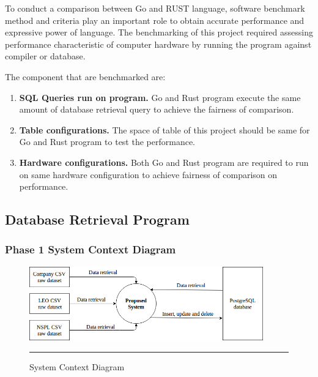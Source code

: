 To conduct a comparison between Go and RUST language, software benchmark method and criteria play an important role to obtain accurate performance and expressive power of language. The benchmarking of this project required assessing performance characteristic of computer hardware by running the program against compiler or database.

The component that are benchmarked are:  

\begin{enumerate}[topsep=0pt,itemsep=-1ex,partopsep=1ex,parsep=1.5ex]
	
	\item \textbf{SQL Queries run on program. } Go and Rust program execute the same amount of database retrieval query to achieve the fairness of comparison.
	\newline
	\item \textbf{Table configurations.} The space of table of this project should be same for Go and Rust program to test the performance. 
	\newline
	\item \textbf{Hardware configurations. } Both Go and Rust program are required to run on same hardware configuration to achieve fairness of comparison on performance.
	\newline
	
\end{enumerate}

\pagebreak

\subsection{Database Retrieval Program}

\subsubsection{Phase 1 System Context Diagram}

\begin{figure}[H]
	\centering
	\includegraphics[width=0.9\textwidth]{Figure/fyp-context.png}
	\rule{35em}{0.5pt}
	\caption[System Context Diagram]{System Context Diagram}
\end{figure}

